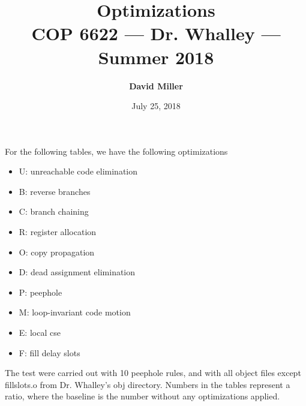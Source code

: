 \documentclass[10pt]{article}
\theoremstyle{remark}
\begin{document}
	
	\title{\bf Optimizations\\[2ex] 
		\rm\normalsize COP 6622 --- Dr. Whalley --- Summer 2018}
	\date{July 25, 2018}
	\author{\bf David Miller}
	
	\maketitle
	
	For the following tables, we have the following optimizations
    \begin{multicols}{3}
    	\begin{itemize}
    		\item U: unreachable code elimination
    		\item B: reverse branches
    		\item C: branch chaining
    		\item R: register allocation
    		\item O: copy propagation
    		\item D: dead assignment elimination
    		\item P: peephole
    		\item M: loop-invariant code motion
    		\item E: local cse
    		\item F: fill delay slots
    	\end{itemize}
    \end{multicols} 
    The test were carried out with 10 peephole rules, and with all object files except fillslots.o from Dr. Whalley's obj directory. Numbers in the tables represent a ratio, where the baseline is the number without any optimizations applied. \\ \\
	
\end{document}
